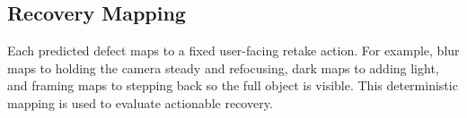 \subsection{Recovery Mapping}
Each predicted defect maps to a fixed user-facing retake action. For example, blur maps to holding the camera steady and refocusing, dark maps to adding light, and framing maps to stepping back so the full object is visible. This deterministic mapping is used to evaluate actionable recovery.
